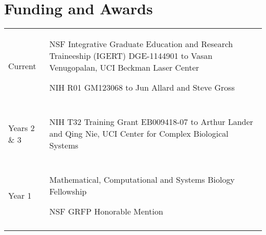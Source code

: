 \documentclass[letterpaper,10pt]{article} %
\makeatletter
\newcommand\cellwidth{\TX@col@width}
\makeatother
\begin{document}

\section*{Funding and Awards}

\begin{tabularx}{\textwidth}{>{\raggedleft}p{} | X}

Current &
\begin{minipage}{\cellwidth}
\begin{description}[itemsep=.25ex,labelsep=0em]
\item NSF Integrative Graduate Education and Research Traineeship (IGERT) DGE-1144901 to Vasan Venugopalan, UCI Beckman Laser Center
\item NIH R01 GM123068 to Jun Allard and Steve Gross
\end{description}
\end{minipage} \\

\multicolumn{2}{c}{} \\

Years 2 \& 3 &
\begin{minipage}{\cellwidth}
\begin{description}[itemsep=.25ex,labelsep=0em]
\item NIH T32 Training Grant EB009418-07 to Arthur Lander and Qing Nie, UCI Center for Complex Biological Systems
\end{description}
\end{minipage} \\

\multicolumn{2}{c}{} \\

Year 1 &
\begin{minipage}{\cellwidth}
\begin{description}[itemsep=.25ex,labelsep=0em]
\item Mathematical, Computational and Systems Biology Fellowship
\item NSF GRFP Honorable Mention
\end{description}
\end{minipage} \\

\multicolumn{2}{c}{} \\
 

\end{tabularx}
\end{document}
